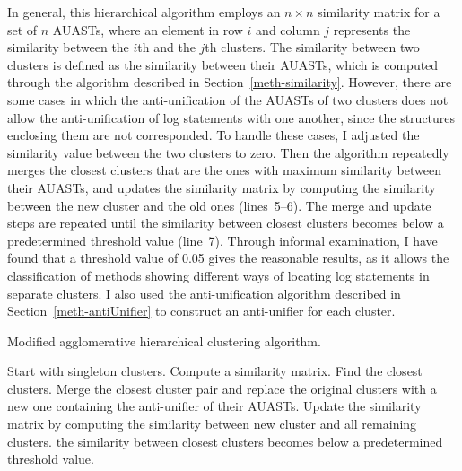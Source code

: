 In general, this hierarchical algorithm employs an $n \times n$ similarity matrix for a set of $n$ AUASTs, where an element in row $i$ and column $j$ represents the similarity between the $i$th and the $j$th clusters. The similarity between two clusters is defined as the similarity between their AUASTs, which is computed through the algorithm described in Section~\ref{meth-similarity}. However, there are some cases in which the anti-unification of the AUASTs of two clusters does not allow the anti-unification of log statements with one another, since the structures enclosing them are not corresponded. To handle these cases, I adjusted the similarity value between the two clusters to zero. Then the algorithm repeatedly merges the closest clusters that are the ones with maximum similarity between their AUASTs, and updates the similarity matrix by computing the similarity between the new cluster and the old ones (lines~5--6). The merge and update steps are repeated until the similarity between closest clusters becomes below a predetermined threshold value (line~7). Through informal examination, I have found that a threshold value of 0.05 gives the reasonable results, as it allows the classification of methods showing different ways of locating log statements in separate clusters. I also used the anti-unification algorithm described in Section~\ref{meth-antiUnifier} to construct an anti-unifier for each cluster.



\begin{algorithm}
\caption{Modified agglomerative hierarchical clustering algorithm.} \label{modified-agglomerative}
\begin{algorithmic}[1]
\State Start with singleton clusters.
\State Compute a similarity matrix.
\Repeat
\State Find the closest clusters.
\State Merge the closest cluster pair and replace the original clusters with a new one containing the anti-unifier of their AUASTs.
\State Update the similarity matrix by computing the similarity between new cluster and all remaining clusters.
\Until the similarity between closest clusters becomes below a predetermined threshold value.
\end{algorithmic}
\end{algorithm}


